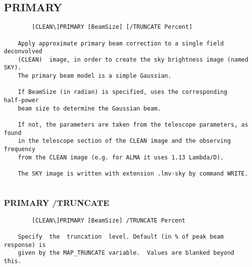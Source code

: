 \subsection{PRIMARY}
\begin{verbatim}
        [CLEAN\]PRIMARY [BeamSize] [/TRUNCATE Percent]

    Apply approximate primary beam correction to a single field  deconvolved
    (CLEAN)  image, in order to create the sky brightness image (named SKY).
    The primary beam model is a simple Gaussian.

    If BeamSize (in radian) is specified, uses the corresponding  half-power
    beam size to determine the Gaussian beam.

    If not, the parameters are taken from the telescope parameters, as found
    in the telescope section of the CLEAN image and the observing  frequency
    from the CLEAN image (e.g. for ALMA it uses 1.13 Lambda/D).

    The SKY image is written with extension .lmv-sky by command WRITE.


\end{verbatim}
\subsubsection{PRIMARY /TRUNCATE}
\begin{verbatim}
        [CLEAN\]PRIMARY [BeamSize] /TRUNCATE Percent

    Specify  the  truncation  level. Default (in % of peak beam response) is
    given by the MAP_TRUNCATE variable.  Values are blanked beyond this.

\end{verbatim}
